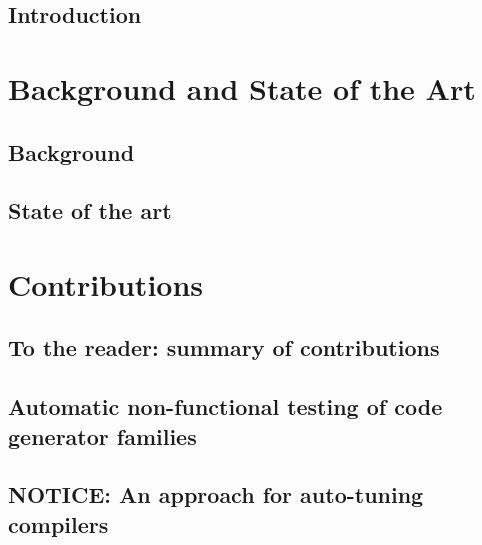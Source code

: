 \documentclass[letterpaper,12pt,titlepage, english, openright]{book}
\let\origdoublepage\cleardoublepage
\newcommand{\clearemptydoublepage}{%
  \clearpage{\pagestyle{empty}\origdoublepage}}
\let\cleardoublepage\clearemptydoublepage
\begin{document}





\frontmatter

\tableofcontents%

 

\mainmatter
%
\chapter[Introduction]{Introduction}\label{chap:intro}

\part{Background and State of the Art}
\chapter[Background]{Background}\label{chap:background}

\chapter[State of the art]{State of the art}\label{chap:SOTA}

\part{Contributions}
\chapter*{To the reader: summary of contributions}\label{chap:summary}

\chapter[Automatic non-functional testing of code generator families]{Automatic non-functional testing of code generator families}\label{chap:code generators}

\chapter[NOTICE: An approach for auto-tuning compilers]{NOTICE: An approach for auto-tuning compilers}\label{chap:compilers}

\end{document}
